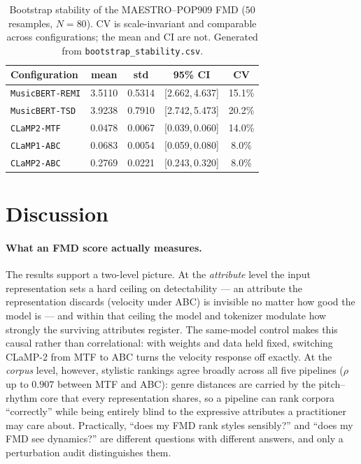 \documentclass[11pt]{article}
\begin{document}
\begin{table}[t]
\centering
\caption{Bootstrap stability of the MAESTRO--POP909 FMD ($50$ resamples,
$N=80$). CV is scale-invariant and comparable across configurations; the
mean and CI are not. Generated from \texttt{bootstrap\_stability.csv}.}
\label{tab:boot}
\small
\begin{tabular}{@{}lcccc@{}}
\toprule
Configuration & mean & std & 95\% CI & CV \\
\midrule
\texttt{MusicBERT-REMI} & 3.5110 & 0.5314 & [2.662,\,4.637] & 15.1\% \\
\texttt{MusicBERT-TSD} & 3.9238 & 0.7910 & [2.742,\,5.473] & 20.2\% \\
\texttt{CLaMP2-MTF} & 0.0478 & 0.0067 & [0.039,\,0.060] & 14.0\% \\
\texttt{CLaMP1-ABC} & 0.0683 & 0.0054 & [0.059,\,0.080] & 8.0\% \\
\texttt{CLaMP2-ABC} & 0.2769 & 0.0221 & [0.243,\,0.320] & 8.0\% \\
\bottomrule
\end{tabular}
\end{table}

\section{Discussion}
\label{sec:discussion}
\paragraph{What an FMD score actually measures.}
The results support a two-level picture. At the \emph{attribute} level the
input representation sets a hard ceiling on detectability --- an attribute
the representation discards (velocity under ABC) is invisible no matter
how good the model is --- and within that ceiling the model and tokenizer
modulate how strongly the surviving attributes register. The same-model
control makes this causal rather than correlational: with weights and data
held fixed, switching CLaMP-2 from MTF to ABC turns the velocity response
off exactly. At the \emph{corpus} level, however, stylistic rankings agree
broadly across all five pipelines ($\rho$ up to $0.907$ between MTF and
ABC): genre distances are carried by the pitch--rhythm core that every
representation shares, so a pipeline can rank corpora ``correctly'' while
being entirely blind to the expressive attributes a practitioner may care
about. Practically, ``does my FMD rank styles sensibly?'' and ``does my
FMD see dynamics?'' are different questions with different answers, and
only a perturbation audit distinguishes them.
\end{document}
